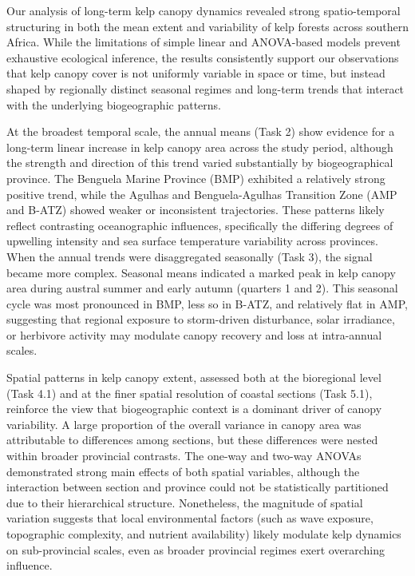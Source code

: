 \documentclass[
  british,
  10pt,
]{article}
\begin{document}
Our analysis of long-term kelp canopy dynamics revealed strong
spatio-temporal structuring in both the mean extent and variability of
kelp forests across southern Africa. While the limitations of simple
linear and ANOVA-based models prevent exhaustive ecological inference,
the results consistently support our observations that kelp canopy cover
is not uniformly variable in space or time, but instead shaped by
regionally distinct seasonal regimes and long-term trends that interact
with the underlying biogeographic patterns.

At the broadest temporal scale, the annual means (Task 2) show evidence
for a long-term linear increase in kelp canopy area across the study
period, although the strength and direction of this trend varied
substantially by biogeographical province. The Benguela Marine Province
(BMP) exhibited a relatively strong positive trend, while the Agulhas
and Benguela-Agulhas Transition Zone (AMP and B-ATZ) showed weaker or
inconsistent trajectories. These patterns likely reflect contrasting
oceanographic influences, specifically the differing degrees of
upwelling intensity and sea surface temperature variability across
provinces. When the annual trends were disaggregated seasonally (Task
3), the signal became more complex. Seasonal means indicated a marked
peak in kelp canopy area during austral summer and early autumn
(quarters 1 and 2). This seasonal cycle was most pronounced in BMP, less
so in B-ATZ, and relatively flat in AMP, suggesting that regional
exposure to storm-driven disturbance, solar irradiance, or herbivore
activity may modulate canopy recovery and loss at intra-annual scales.

Spatial patterns in kelp canopy extent, assessed both at the bioregional
level (Task 4.1) and at the finer spatial resolution of coastal sections
(Task 5.1), reinforce the view that biogeographic context is a dominant
driver of canopy variability. A large proportion of the overall variance
in canopy area was attributable to differences among sections, but these
differences were nested within broader provincial contrasts. The one-way
and two-way ANOVAs demonstrated strong main effects of both spatial
variables, although the interaction between section and province could
not be statistically partitioned due to their hierarchical structure.
Nonetheless, the magnitude of spatial variation suggests that local
environmental factors (such as wave exposure, topographic complexity,
and nutrient availability) likely modulate kelp dynamics on
sub-provincial scales, even as broader provincial regimes exert
overarching influence.
\end{document}
